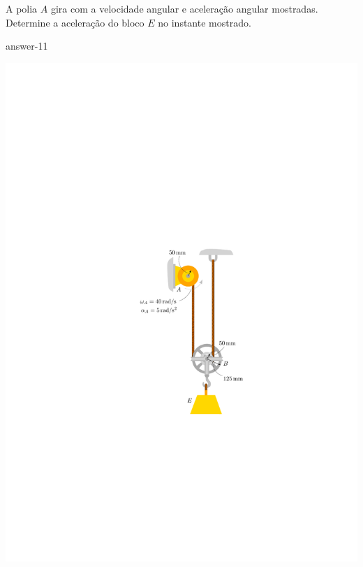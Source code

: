 \item A polia $A$ gira com a velocidade angular e aceleração angular mostradas. Determine a aceleração do
bloco $E$ no instante mostrado.

{answer-11}

\vspace{-1.5cm}
\begin{flushright}
	\includegraphics[scale=1.2]{images/draw_13}
\end{flushright}